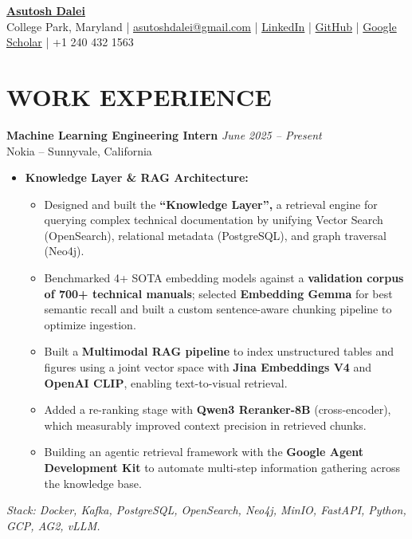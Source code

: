 \documentclass[9pt]{article}
\newcommand{\namesize}{\fontsize{20}{22}\selectfont}
\newcommand{\headersize}{\fontsize{10}{12}\selectfont}
\begin{document}
\pagestyle{empty}

\begin{center}
    {\bfseries \color{black} \namesize
    \href{https://asutoshdalei.github.io/AsutoshDalei/}{Asutosh Dalei}}\\[6pt]
    {\headersize
    College Park, Maryland |
    \href{mailto:asutoshdalei@gmail.com}{asutoshdalei@gmail.com} |
    \href{https://www.linkedin.com/in/asutosh-dalei2212}{LinkedIn} |
    \href{https://github.com/AsutoshDalei}{GitHub} |
    \href{https://scholar.google.com/citations?user=ZTEw6iQAAAAJ&hl=en&oi=sra}{Google Scholar} |
    +1 240 432 1563}
\end{center}
\vspace{-7pt}

\section*{WORK EXPERIENCE}

\textbf{Machine Learning Engineering Intern} \hfill \textit{June 2025 -- Present}\\
Nokia -- Sunnyvale, California
\begin{itemize}
    \item \textbf{Knowledge Layer \& RAG Architecture:}
    \begin{itemize}
        \item Designed and built the \textbf{``Knowledge Layer'',} a retrieval engine for querying complex technical documentation by unifying Vector Search (OpenSearch), relational metadata (PostgreSQL), and graph traversal (Neo4j).
        \item Benchmarked 4+ SOTA embedding models against a \textbf{validation corpus of 700+ technical manuals}; selected \textbf{Embedding Gemma} for best semantic recall and built a custom sentence-aware chunking pipeline to optimize ingestion.
        \item Built a \textbf{Multimodal RAG pipeline} to index unstructured tables and figures using a joint vector space with \textbf{Jina Embeddings V4} and \textbf{OpenAI CLIP}, enabling text-to-visual retrieval.
        \item Added a re-ranking stage with \textbf{Qwen3 Reranker-8B} (cross-encoder), which measurably improved context precision in retrieved chunks.
        \item Building an agentic retrieval framework with the \textbf{Google Agent Development Kit} to automate multi-step information gathering across the knowledge base.
    \end{itemize}
\end{itemize}
\textit{Stack: Docker, Kafka, PostgreSQL, OpenSearch, Neo4j, MinIO, FastAPI, Python, GCP, AG2, vLLM.}
\end{document}
